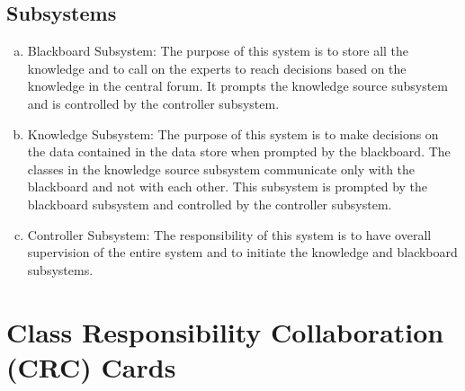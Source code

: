 \documentclass[]{article}
\begin{document}
\subsection{Subsystems}
\label{sub:subsystems}
\begin{enumerate}[a)]
	\item Blackboard Subsystem: The purpose of this system is to store all the knowledge and to call on the experts to reach decisions based on the knowledge in the central forum. It prompts the knowledge source subsystem and is controlled by the controller subsystem.
	\item Knowledge Subsystem: The purpose of this system is to make decisions on the data contained in the data store when prompted by the blackboard. The classes in the knowledge source subsystem communicate only with the blackboard and not with each other. This subsystem is prompted by the blackboard subsystem and controlled by the controller subsystem.
	\item Controller Subsystem: The responsibility of this system is to have overall supervision of the entire system and to initiate the knowledge and blackboard subsystems.
\end{enumerate}


\section{Class Responsibility Collaboration (CRC) Cards}
\label{sec:class_responsibility_collaboration_crc_cards}
\end{document}
